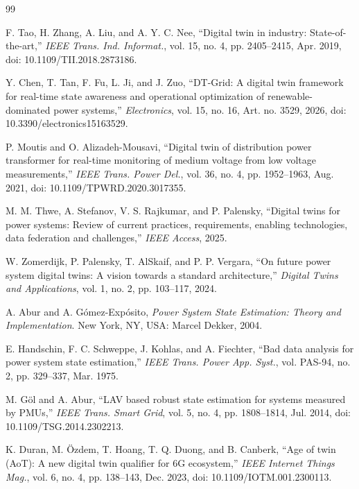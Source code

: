 \documentclass[journal]{IEEEtran}
\theoremstyle{plain}
\theoremstyle{definition}
\theoremstyle{remark}
\begin{document}
\begin{thebibliography}{99}

\footnotesize

 F. Tao, H. Zhang, A. Liu, and A. Y. C. Nee, ``Digital twin in industry: State-of-the-art,'' \emph{IEEE Trans. Ind. Informat.}, vol. 15, no. 4, pp. 2405--2415, Apr. 2019, doi: 10.1109/TII.2018.2873186.

 Y. Chen, T. Tan, F. Fu, L. Ji, and J. Zuo, ``DT-Grid: A digital twin framework for real-time state awareness and operational optimization of renewable-dominated power systems,'' \emph{Electronics}, vol. 15, no. 16, Art. no. 3529, 2026, doi: 10.3390/electronics15163529.

 P. Moutis and O. Alizadeh-Mousavi, ``Digital twin of distribution power transformer for real-time monitoring of medium voltage from low voltage measurements,'' \emph{IEEE Trans. Power Del.}, vol. 36, no. 4, pp. 1952--1963, Aug. 2021, doi: 10.1109/TPWRD.2020.3017355.

 M. M. Thwe, A. Stefanov, V. S. Rajkumar, and P. Palensky, ``Digital twins for power systems: Review of current practices, requirements, enabling technologies, data federation and challenges,'' \emph{IEEE Access}, 2025.

 W. Zomerdijk, P. Palensky, T. AlSkaif, and P. P. Vergara, ``On future power system digital twins: A vision towards a standard architecture,'' \emph{Digital Twins and Applications}, vol. 1, no. 2, pp. 103--117, 2024.

 A. Abur and A. G\'{o}mez-Exp\'{o}sito, \emph{Power System State Estimation: Theory and Implementation}. New York, NY, USA: Marcel Dekker, 2004.

 E. Handschin, F. C. Schweppe, J. Kohlas, and A. Fiechter, ``Bad data analysis for power system state estimation,'' \emph{IEEE Trans. Power App. Syst.}, vol. PAS-94, no. 2, pp. 329--337, Mar. 1975.

 M. G\"{o}l and A. Abur, ``LAV based robust state estimation for systems measured by PMUs,'' \emph{IEEE Trans. Smart Grid}, vol. 5, no. 4, pp. 1808--1814, Jul. 2014, doi: 10.1109/TSG.2014.2302213.

 K. Duran, M. \"{O}zdem, T. Hoang, T. Q. Duong, and B. Canberk, ``Age of twin (AoT): A new digital twin qualifier for 6G ecosystem,'' \emph{IEEE Internet Things Mag.}, vol. 6, no. 4, pp. 138--143, Dec. 2023, doi: 10.1109/IOTM.001.2300113.


\end{thebibliography}
\end{document}
